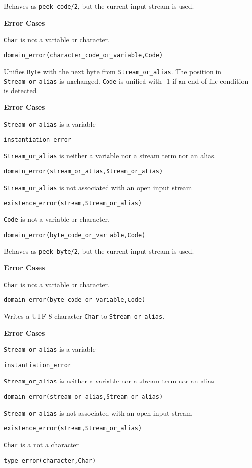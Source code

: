 \begin{description}
%
Behaves as {\tt peek\_code/2}, but the current input stream is used.

{\bf Error Cases}
\bi
\item 	{\tt Char} is not a variable or character.
\bi
\item 	{\tt domain\_error(character\_code\_or\_variable,Code)}
\ei
\ei

%
Unifies {\tt Byte} with the next byte from {\tt Stream\_or\_alias}.
The position in {\tt Stream\_or\_alias} is unchanged.  {\tt Code} is
unified with -1 if an end of file condition is detected.

{\bf Error Cases}
\bi
\item 	{\tt Stream\_or\_alias} is a variable
\bi
\item {\tt instantiation\_error}
\ei
\item 	{\tt Stream\_or\_alias} is neither a variable nor a stream term nor an alias.
\bi
\item 	{\tt domain\_error(stream\_or\_alias,Stream\_or\_alias)}
\ei
\item 	{\tt Stream\_or\_alias} is not associated with an open input stream
\bi
\item 	{\tt existence\_error(stream,Stream\_or\_alias)}
\ei
\item 	{\tt Code} is not a variable or character.
\bi
\item 	{\tt domain\_error(byte\_code\_or\_variable,Code)}
\ei
\ei


Behaves as {\tt peek\_byte/2}, but the current input stream is used.

{\bf Error Cases}
\bi
\item 	{\tt Char} is not a variable or character.
\bi
\item 	{\tt domain\_error(byte\_code\_or\_variable,Code)}
\ei
\ei

%
Writes a UTF-8 character {\tt Char} to {\tt Stream\_or\_alias}.

{\bf Error Cases}
\bi
\item 	{\tt Stream\_or\_alias} is a variable
\bi
\item {\tt instantiation\_error}
\ei
\item 	{\tt Stream\_or\_alias} is neither a variable nor a stream term nor an alias.
\bi
\item 	{\tt domain\_error(stream\_or\_alias,Stream\_or\_alias)}
\ei
\item 	{\tt Stream\_or\_alias} is not associated with an open input stream
\bi
\item 	{\tt existence\_error(stream,Stream\_or\_alias)}
\ei
\item 	{\tt Char} is a not a character
\bi
\item 	{\tt type\_error(character,Char)}
\ei
\ei


\end{description}
